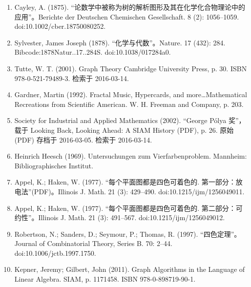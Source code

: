 \begin{enumerate}
\item  Cayley, A. (1875). “论数学中被称为树的解析图形及其在化学化合物理论中的应用”。Berichte der Deutschen Chemischen Gesellschaft. 8 (2): 1056–1059. doi:10.1002/cber.18750080252.
\item Sylvester, James Joseph (1878). “化学与代数”。Nature. 17 (432): 284. Bibcode:1878Natur..17..284S. doi:10.1038/017284a0.
\item Tutte, W. T. (2001). Graph Theory Cambridge University Press, p. 30. ISBN 978-0-521-79489-3. 检索于 2016-03-14.
\item Gardner, Martin (1992). Fractal Music, Hypercards, and more…Mathematical Recreations from Scientific American. W. H. Freeman and Company, p. 203.
\item Society for Industrial and Applied Mathematics (2002). “George Pólya 奖”，载于 Looking Back, Looking Ahead: A SIAM History (PDF), p. 26. 原始 (PDF) 存档于 2016-03-05. 检索于 2016-03-14.
\item Heinrich Heesch (1969). Untersuchungen zum Vierfarbenproblem. Mannheim: Bibliographisches Institut.
\item Appel, K.; Haken, W. (1977). “每个平面图都是四色可着色的. 第一部分：放电法”(PDF)。Illinois J. Math. 21 (3): 429–490. doi:10.1215/ijm/1256049011.
\item Appel, K.; Haken, W. (1977). “每个平面图都是四色可着色的. 第二部分：可约性”。Illinois J. Math. 21 (3): 491–567. doi:10.1215/ijm/1256049012.
\item Robertson, N.; Sanders, D.; Seymour, P.; Thomas, R. (1997). “四色定理”。Journal of Combinatorial Theory, Series B. 70: 2–44. doi:10.1006/jctb.1997.1750.
\item Kepner, Jeremy; Gilbert, John (2011). Graph Algorithms in the Language of Linear Algebra. SIAM, p. 1171458. ISBN 978-0-898719-90-1.
\end{enumerate}
